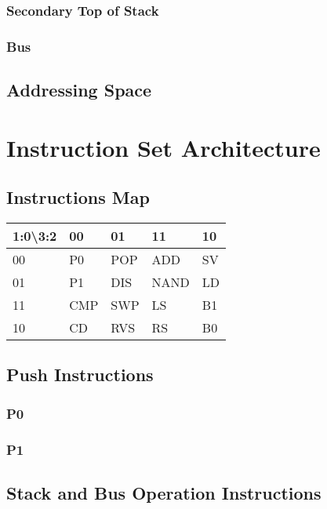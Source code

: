 \documentclass[11pt]{report}
\begin{document}
    \subsection{Secondary Top of Stack}
    \subsection{Bus}

    \section{Addressing Space}



    \chapter{Instruction Set Architecture}
    \section{Instructions Map}
    \begin{table}[h]
        \begin{tabular}{|l|l|l|l|l|}
        \hline
        1:0\textbackslash{}3:2 & 00  & 01  & 11   & 10 \\ \hline
        00                     & P0  & POP & ADD  & SV \\ \hline
        01                     & P1  & DIS & NAND & LD \\ \hline
        11                     & CMP & SWP & LS   & B1 \\ \hline
        10                     & CD  & RVS & RS   & B0 \\ \hline
        \end{tabular}
    \end{table}
    \section{Push Instructions}
    \subsection{P0}
    \subsection{P1}

    \section{Stack and Bus Operation Instructions}
\end{document}
